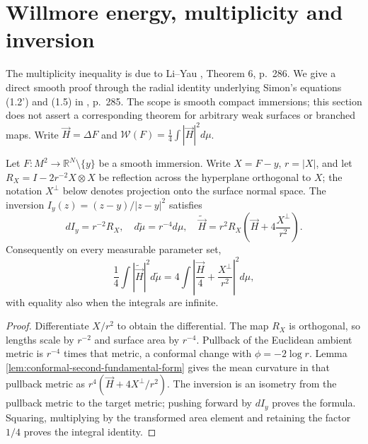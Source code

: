 \chapter{Willmore energy, multiplicity and inversion}\label{sec:willmore-multiplicity-inversion}
The multiplicity inequality is due to Li--Yau \cite{LY82}, Theorem 6, p.~286. We give a direct smooth proof through the radial identity underlying Simon's equations (1.2') and (1.5) in \cite{SimW93}, p.~285. The scope is smooth compact immersions; this section does not assert a corresponding theorem for arbitrary weak surfaces or branched maps. Write $\vec H=\Delta F$ and $\mathcal W(F)=\frac14\int|\vec H|^2d\mu$.

\begin{lemma}\label{lem:inversion-mean-curvature-vector}
Let $F:M^2\to\mathbb R^N\setminus\{y\}$ be a smooth immersion. Write $X=F-y$, $r=|X|$, and let $R_X=I-2r^{-2}X\otimes X$ be reflection across the hyperplane orthogonal to $X$; the notation $X^\perp$ below denotes projection onto the surface normal space. The inversion $I_y(z)=(z-y)/|z-y|^2$ satisfies
\[
 dI_y=r^{-2}R_X,\quad d\widetilde\mu=r^{-4}d\mu,\quad
 \widetilde{\vec H}=r^2R_X\left(\vec H+4\frac{X^\perp}{r^2}\right).
\]
Consequently on every measurable parameter set,
\[
 \frac14\int|\widetilde{\vec H}|^2d\widetilde\mu
 =4\int\left|\frac{\vec H}{4}+\frac{X^\perp}{r^2}\right|^2d\mu,
\]
with equality also when the integrals are infinite.
\end{lemma}
\begin{proof}
Differentiate $X/r^2$ to obtain the differential. The map $R_X$ is orthogonal, so lengths scale by $r^{-2}$ and surface area by $r^{-4}$. Pullback of the Euclidean ambient metric is $r^{-4}$ times that metric, a conformal change with $\phi=-2\log r$. Lemma \ref{lem:conformal-second-fundamental-form} gives the mean curvature in that pullback metric as $r^4(\vec H+4X^\perp/r^2)$. The inversion is an isometry from the pullback metric to the target metric; pushing forward by $dI_y$ proves the formula. Squaring, multiplying by the transformed area element and retaining the factor $1/4$ proves the integral identity.
\end{proof}

